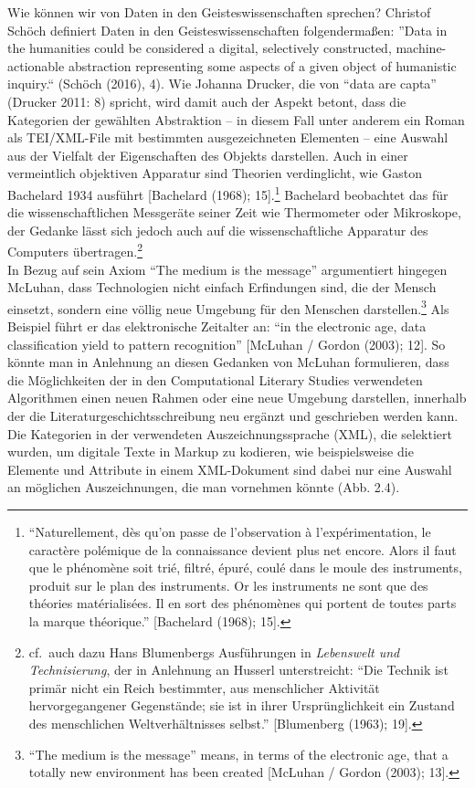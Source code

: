 \documentclass[
  12pt,
  letterpaper,
  DIV=11,
  numbers=noendperiod]{scrreprt}
\begin{document}
Wie können wir von Daten in den Geisteswissenschaften sprechen? Christof
Schöch definiert Daten in den Geisteswissenschaften folgendermaßen:
''Data in the humanities could be considered a digital, selectively
constructed, machine-actionable abstraction representing some aspects of
a given object of humanistic inquiry.`` (Schöch (2016), 4). Wie Johanna
Drucker, die von ``data are capta'' (Drucker 2011: 8) spricht, wird
damit auch der Aspekt betont, dass die Kategorien der gewählten
Abstraktion -- in diesem Fall unter anderem ein Roman als TEI/XML-File
mit bestimmten ausgezeichneten Elementen -- eine Auswahl aus der
Vielfalt der Eigenschaften des Objekts darstellen. Auch in einer
vermeintlich objektiven Apparatur sind Theorien verdinglicht, wie Gaston
Bachelard 1934 ausführt {[}Bachelard (1968); 15{]}.\footnote{``Naturellement,
  dès qu'on passe de l'observation à l'expérimentation, le caractère
  polémique de la connaissance devient plus net encore. Alors il faut
  que le phénomène soit trié, filtré, épuré, coulé dans le moule des
  instruments, produit sur le plan des instruments. Or les instruments
  ne sont que des théories matérialisées. Il en sort des phénomènes qui
  portent de toutes parts la marque théorique.'' {[}Bachelard (1968);
  15{]}.} Bachelard beobachtet das für die wissenschaftlichen Messgeräte
seiner Zeit wie Thermometer oder Mikroskope, der Gedanke lässt sich
jedoch auch auf die wissenschaftliche Apparatur des Computers
übertragen.\footnote{cf.~auch dazu Hans Blumenbergs Ausführungen in
  \emph{Lebenswelt und Technisierung}, der in Anlehnung an Husserl
  unterstreicht: ``Die Technik ist primär nicht ein Reich bestimmter,
  aus menschlicher Aktivität hervorgegangener Gegenstände; sie ist in
  ihrer Ursprünglichkeit ein Zustand des menschlichen Weltverhältnisses
  selbst.'' {[}Blumenberg (1963); 19{]}.}\\
In Bezug auf sein Axiom ``The medium is the message'' argumentiert
hingegen McLuhan, dass Technologien nicht einfach Erfindungen sind, die
der Mensch einsetzt, sondern eine völlig neue Umgebung für den Menschen
darstellen.\footnote{``The medium is the message'' means, in terms of
  the electronic age, that a totally new environment has been created
  {[}McLuhan / Gordon (2003); 13{]}.} Als Beispiel führt er das
elektronische Zeitalter an: ``in the electronic age, data classification
yield to pattern recognition'' {[}McLuhan / Gordon (2003); 12{]}. So
könnte man in Anlehnung an diesen Gedanken von McLuhan formulieren, dass
die Möglichkeiten der in den Computational Literary Studies verwendeten
Algorithmen einen neuen Rahmen oder eine neue Umgebung darstellen,
innerhalb der die Literaturgeschichtsschreibung neu ergänzt und
geschrieben werden kann.\\
Die Kategorien in der verwendeten Auszeichnungssprache (XML), die
selektiert wurden, um digitale Texte in Markup zu kodieren, wie
beispielsweise die Elemente und Attribute in einem XML-Dokument sind
dabei nur eine Auswahl an möglichen Auszeichnungen, die man vornehmen
könnte (Abb. 2.4).
\end{document}
